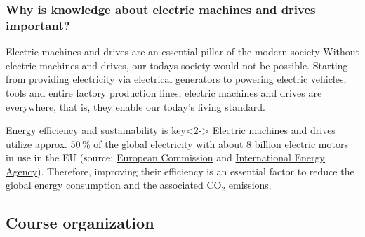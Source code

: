 \begin{frame}
	\frametitle{Why is knowledge about electric machines and drives important?}
	\begin{varblock}{Electric machines and drives are an essential pillar of the modern society}
		Without electric machines and drives, our todays society would not be possible. Starting from providing electricity via electrical generators to powering electric vehicles, tools and entire factory production lines, electric machines and drives are everywhere, that is, they enable our today's living standard. 
	\end{varblock}
	\begin{varblock}{Energy efficiency and sustainability is key}<2->
		Electric machines and drives utilize  approx. 50\,\% of the global electricity with about 8 billion electric motors in use in the EU (source: \href{https://commission.europa.eu/energy-climate-change-environment/standards-tools-and-labels/products-labelling-rules-and-requirements/energy-label-and-ecodesign/energy-efficient-products/electric-motors-and-variable-speed-drives_en}{European Commission} and \href{https://iea.blob.core.windows.net/assets/d69b2a76-feb9-4a74-a921-2490a8fefcdf/EE_for_ElectricSystems.pdf}{International Energy Agency}). Therefore, improving their efficiency is an essential factor to reduce the global energy consumption and the associated CO$_2$ emissions.
	\end{varblock}
\end{frame}

\subsection{Course organization}

